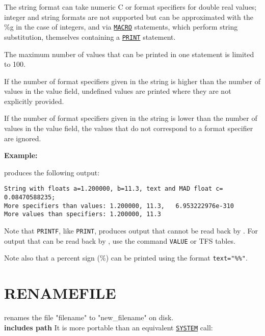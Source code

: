 The string format can take numeric C or \madx format specifiers for
double real values; integer and string formats are not supported but 
can be approximated with the \%g in the case of integers, and via
\hyperref[sec:macro]{\tt MACRO} statements, which perform string
substitution, themselves containing a \hyperref[sec:print]{\tt PRINT}
statement.  

The maximum number of values that can be printed in one
statement is limited to 100. 

If the number of format specifiers given in the string is higher 
than the number of values in the value field, undefined values are printed 
where they are not explicitly provided. 

If the number of format specifiers given in the string is lower 
than the number of values in the value field, the values that 
do not correspond to a format specifier are ignored. 


{\bf Example:}

produces the following output:
\begin{verbatim}
String with floats a=1.200000, b=11.3, text and MAD float c=     0.08470588235;
More specifiers than values: 1.200000, 11.3,   6.953222976e-310
More values than specifiers: 1.200000, 11.3
\end{verbatim}

Note that {\tt PRINTF}, like {\tt PRINT}, produces output that
cannot be read back by \madx. For output that can be read back by \madx,
use the command {\tt VALUE} or TFS tables.

Note also that a percent sign (\%) can be printed using the format
\verb|text="%%"|. 


\section{RENAMEFILE}
\label{sec:renamefile}
renames the file "filename" to "new\_filename" on disk. \\
\textbf{includes path}
It is more portable than an equivalent \hyperref[sec:system]{\tt SYSTEM} call:

